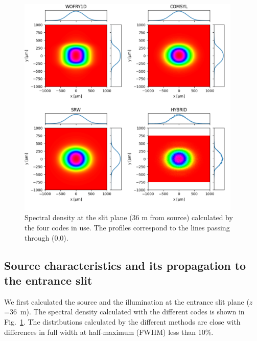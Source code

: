 \documentclass{iucr}
\newcommand{\inblue}[1]{{\color{blue}#1}}
\begin{document}
\begin{figure}
    \label{fig:plot_2D_spectral_density_36m}
    \includegraphics[width=0.95\textwidth]{figures/plot_2D_spectral_density_36m.pdf}
    \caption{Spectral density at the slit plane (36 m from source) calculated by the four codes in use. The profiles correspond to the lines passing through (0,0).
    }
\end{figure}

\subsection{Source characteristics and its propagation to the entrance slit}
\label{sec:results36m}

We first calculated the source and the illumination at the entrance slit plane ($z$=\SI{36}{\meter}).
The spectral density calculated with the different codes is shown in \inblue{Fig.~\ref{fig:plot_2D_spectral_density_36m}}. The distributions calculated by the different methods are close with differences in full width at half-maximum (FWHM) less than 10\%.
\end{document}
